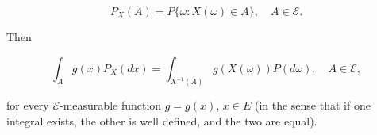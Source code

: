 $$P_X(A) = P\{\omega : X(\omega) \in A\}, \quad A \in \mathcal{E}. \tag{40}$$

Then

$$\int_A g(x) P_X(dx) = \int_{X^{-1}(A)} g(X(\omega)) P(d\omega), \quad A \in \mathcal{E}, \tag{41}$$

for every $\mathcal{E}$-measurable function $g = g(x)$, $x \in E$ (in the sense that if one integral exists, the other is well defined, and the two are equal).
